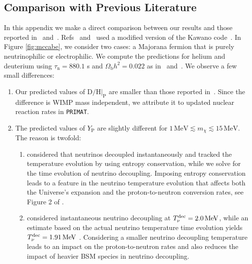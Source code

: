 \documentclass[notitlepage,letterpaper,natbib,aps,prd,onecolumn,amsmath,amsfonts,nofootinbib,preprintnumbers,superscriptaddress,secnumarabic,groupedaddress]{revtex4-1}
\begin{document}
\subsection{Comparison with Previous Literature}\vspace{-0.2cm} \label{app:ComparisonsLiterature}
In this appendix we make a direct comparison between our results and those reported in~\cite{Nollett:2013pwa} and~\cite{Nollett:2014lwa}. Refs~\cite{Nollett:2013pwa} and~\cite{Nollett:2014lwa} used a modified version of the Kawano code~\cite{Kawano:1988vh,Kawano:1992ua}. In Figure \ref{fig:mccabe}, we consider two cases: a Majorana fermion that is purely neutrinophilic or electrophilic. We compute the predictions for helium and deuterium using $\tau_\mathrm{n} =  880.1$ s and $\Omega_\mathrm{b}h^2 = 0.022 $ as in~\cite{Nollett:2013pwa} and~\cite{Nollett:2014lwa}. We observe a few small differences:
\begin{enumerate}[leftmargin=0.5cm,itemsep=0pt]\vspace{-0.1cm}
    \item Our predicted values of $\mathrm{D}/\mathrm{H}|_{\mathrm{P}}$ are smaller than those reported in~\cite{Nollett:2013pwa,Nollett:2014lwa}. Since the difference is WIMP mass independent, we attribute it to updated nuclear reaction rates in \texttt{PRIMAT}. 
    \item The predicted values of $Y_{\mathrm{P}}$ are slightly different for $ 1 \,\text{MeV} \lesssim   m_{\chi} \lesssim 15 \,\text{MeV}$. The reason is twofold:
    \begin{enumerate}[leftmargin=0.5cm,itemsep=0pt]\vspace{-0.1cm}
    \item \cite{Nollett:2013pwa,Nollett:2014lwa} considered that neutrinos decoupled instantaneously and tracked the temperature evolution by using entropy conservation, while we solve for the time evolution of neutrino decoupling. Imposing entropy conservation leads to a feature in the neutrino temperature evolution that affects both the Universe's expansion and the proton-to-neutron conversion rates, see Figure 2 of \cite{Escudero:2018mvt}.
    \item \cite{Nollett:2013pwa,Nollett:2014lwa} considered instantaneous neutrino decoupling at $T_\nu^{\rm dec} = 2.0\,\text{MeV}$, while an estimate based on the actual neutrino temperature time evolution yields $T_\nu^{\rm dec} = 1.91\,\text{MeV}$ \cite{Escudero:2018mvt}. Considering a smaller neutrino decoupling temperature leads to an impact on the proton-to-neutron rates and also reduces the impact of heavier BSM species in neutrino decoupling. 
    \end{enumerate}
\end{enumerate}\vspace{-0.1cm}
\end{document}
